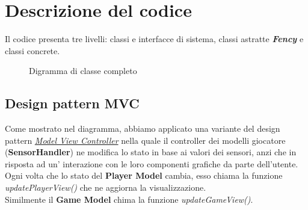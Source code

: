 \documentclass[a4paper,11pt]{article}
\begin{document}
\section{Descrizione del codice}
Il codice presenta tre livelli: classi e interfacce di sistema, classi astratte \textbf{\emph{Fency}} e classi concrete.
\begin{figure}[h]
\caption{Digramma di classe completo}\noindent{}
\end{figure}
\subsection{Design pattern MVC}
Come mostrato nel diagramma, abbiamo applicato una variante del design pattern \hyperref[MVC]{\emph{Model View Controller}} nella quale il controller dei modelli giocatore (\textbf{SensorHandler}) ne modifica lo stato in base ai valori dei sensori, anzi che in risposta ad un' interazione con le loro componenti grafiche da parte dell'utente. Ogni volta che lo stato del \textbf{Player Model} cambia, esso chiama la funzione \emph{updatePlayerView()} che ne aggiorna la visualizzazione. \\Similmente il \textbf{Game Model} chima la funzione \emph{updateGameView()}.
\newpage
\end{document}
